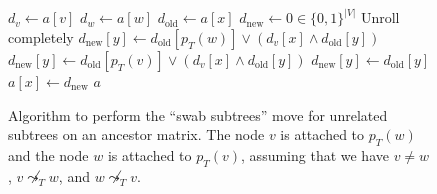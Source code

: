 \begin{figure}[p]
    \begin{algorithmic}[1]
        \State $d_v \leftarrow a[v]$
        \State $d_w \leftarrow a[w]$
            \State $d_\mathrm{old} \leftarrow a[x]$
            \State $d_\mathrm{new} \leftarrow 0 \in \{0,1\}^{|V|}$
             \Comment Unroll completely
                    \State $d_\mathrm{new}[y] \leftarrow d_\mathrm{old}[p_T(w)] \vee (d_v[x] \wedge d_\mathrm{old}[y])$
                    \State $d_\mathrm{new}[y] \leftarrow d_\mathrm{old}[p_T(v)] \vee (d_v[x] \wedge d_\mathrm{old}[y])$
                \Else
                    \State $d_\mathrm{new}[y] \leftarrow d_\mathrm{old}[y]$
                \EndIf
            \EndFor
            \State $a[x] \leftarrow d_\mathrm{new}$
        \EndFor
        \State \Return $a$
        \EndFunction
    \end{algorithmic}
    \caption{Algorithm to perform the ``swab subtrees'' move for unrelated subtrees on an ancestor matrix. The node $v$ is attached to $p_T(w)$ and the node $w$ is attached to $p_T(v)$, assuming that we have $v \neq w$, $v \not\leadsto_T w$, and $w \not\leadsto_T v$.}
    \label{alg:am_swap_unrelated}
\end{figure}

